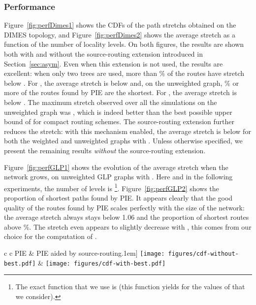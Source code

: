 \documentclass[conference]{IEEEtran}
\begin{document}
\subsubsection{Performance}
Figure~\ref{fig:perfDimes1} shows the CDFs of the path stretchs obtained on the DIMES topology, and Figure~\ref{fig:perfDimes2} shows the average stretch as a function of the number of locality levels. On both figures, the results are shown both with and without the source-routing extension introduced in Section~\ref{sec:asym}. Even when this extension is not used, the results are excellent: when only two trees are used, more than \% of the routes have stretch below . For , the average stretch is below  and, on the unweighted graph, \% or more of the routes found by PIE are the shortest. For , the average stretch is below . 
The maximum stretch observed over all the simulations on the unweighted graph was , which is indeed better than the best possible upper bound of  for compact routing schemes.
The source-routing extension further reduces the stretch: with this mechanism enabled, the average stretch is below  for both the weighted and unweighted graphs with . Unless otherwise specified, we present the remaining results \emph{without} the source-routing extension.






Figure~\ref{fig:perfGLP1} shows the evolution of the average stretch when the network grows, on unweighted GLP graphs with . Here and in the following experiments, the number of levels is \footnote{The exact function that we use is  (this function yields  for the values of  that we consider).}. Figure~\ref{fig:perfGLP2} shows the proportion of shortest paths found by PIE. It appears clearly that the good quality of the routes found by PIE scales perfectly with the size of the network: the average stretch always stays below 1.06 and the proportion of shortest routes above \%. The stretch even appears to slightly decrease with , this comes from our choice for the computation of .





\begin{figure*}
\centering
\begin{tabular}{c c}
PIE & PIE aided by source-routing\0.1em]
\texttt{[image: figures/cdf-without-best.pdf]} &
\texttt{[image: figures/cdf-with-best.pdf]}\\
\end{tabular}
\vspace{-1em}
\caption{DIMES topology. Empirical CDFs of the path stretchs for several values of  (the number of levels), with and without costs attributed to links. Left: results for PIE alone. Right: results for PIE aided by the optional source-routing mechanism.}
\vspace{-1.2em}
\label{fig:perfDimes1}
\end{figure*}
\end{document}
